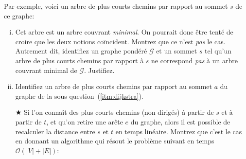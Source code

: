 \documentclass{article}
\newcommand{\avance}{{\large$\bigstar$}}         %
\newcommand{\avancepts}{{\scriptsize$\bigstar$}} %
\renewcommand{\O}{\mathcal{O}}                   %
\renewcommand{\G}{\mathcal{G}}                   %
\begin{document}
\begin{question}
\begin{enumerate}[(a)]
    Par exemple, voici un arbre de plus courts chemins par rapport au
    sommet $s$ de ce graphe:\bigskip\medskip
    \begin{center}
    \end{center}\bigskip\medskip
  
    \begin{enumerate}[(i)]
    \setlength\itemsep{20pt}
      
    \item Cet  arbre est un arbre couvrant
      \emph{minimal}. On pourrait donc être tenté de croire que les
      deux notions coïncident. Montrez que ce n'est \emph{pas} le
      cas. Autrement dit, identifiez un graphe pondéré $\G$ et un
      sommet $s$ tel qu'un arbre de plus courts chemins par rapport à
      $s$ ne correspond \emph{pas} à un arbre couvrant minimal de
      $\G$. Justifiez.

    \item Identifiez  un arbre de plus courts
      chemins par rapport au sommet $a$ du graphe de la
      sous-question~(\ref{itm:dijkstra}).

    \vspace{15pt}
    
    \item[\avance{}] Si \marginpar{\avancepts{} \addbonus{5}} l'on
      connaît des plus courts chemins (non dirigés) à partir de $s$ et
      à partir de $t$, et qu'on retire une arête $e$ du graphe, alors
      il est possible de recalculer la distance entre $s$ et $t$ en
      temps linéaire. Montrez que c'est le cas en donnant un
      algorithme qui résout le problème suivant en temps $\O(|V| +
      |E|)$:


\end{enumerate}
\end{enumerate}
\end{question}
\end{document}
